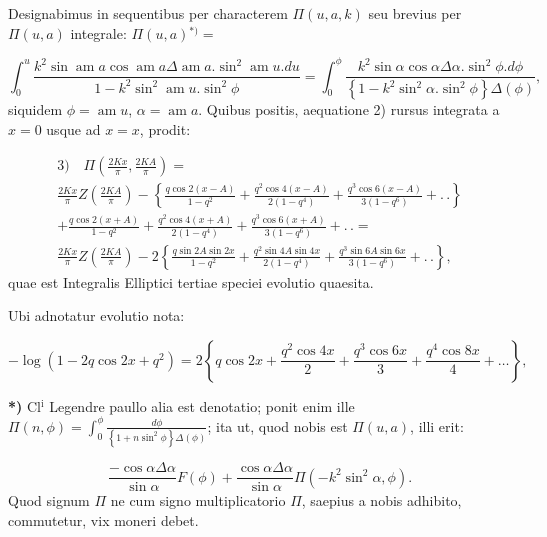 \documentclass{article}
\begin{document}
Designabimus in sequentibus per characterem $\Pi(u,a,k)$ seu brevius per $\Pi(u,a)$ integrale: $\Pi(u,a){}^{*)}=$

\[
\int_{0}^{u}\frac{k^{2}\sin\operatorname{am}a\cos\operatorname{am}a\Delta\operatorname{am}a.\sin^{2}\operatorname{am}u.du}{1-k^{2}\sin^{2}\operatorname{am}u.\sin^{2}\phi}=\int_{0}^{\phi}\frac{k^{2}\sin\alpha\cos\alpha\Delta\alpha.\sin^{2}\phi.d\phi}{\left\{1-k^{2}\sin^{2}\alpha.\sin^{2}\phi\right\}\Delta(\phi)},
\]
siquidem $\phi=\operatorname{am}u$, $\alpha=\operatorname{am}a$. Quibus positis, aequatione 2) rursus integrata a $x=0$ usque ad $x=x$, prodit:

\[
\begin{gathered}
\text{3)}\quad\Pi\left(\frac{2Kx}{\pi},\frac{2KA}{\pi}\right)=\\[1.5ex]
\frac{2Kx}{\pi}Z\left(\frac{2KA}{\pi}\right)-\left\{\frac{q\cos2(x-A)}{1-q^{2}}+\frac{q^{2}\cos4(x-A)}{2(1-q^{4})}+\frac{q^{3}\cos6(x-A)}{3(1-q^{6})}+.\,.\right\}\\[1.5ex]
+\frac{q\cos2(x+A)}{1-q^{2}}+\frac{q^{2}\cos4(x+A)}{2(1-q^{4})}+\frac{q^{3}\cos6(x+A)}{3(1-q^{6})}+.\,.=\\[1.5ex]
\frac{2Kx}{\pi}Z\left(\frac{2KA}{\pi}\right)-2\left\{\frac{q\sin2A\sin2x}{1-q^{2}}+\frac{q^{2}\sin4A\sin4x}{2(1-q^{4})}+\frac{q^{3}\sin6A\sin6x}{3(1-q^{6})}+.\,.\right\},
\end{gathered}
\]
quae est Integralis Elliptici tertiae speciei evolutio quaesita.

Ubi adnotatur evolutio nota:

\[
-\log(1-2q\cos2x+q^{2})=2\left\{q\cos2x+\frac{q^{2}\cos4x}{2}+\frac{q^{3}\cos6x}{3}+\frac{q^{4}\cos8x}{4}+\ldots\right\},
\]

\textbf{*)} Cl$^{\mathrm{i}}$ Legendre paullo alia est denotatio; ponit enim ille $\Pi(n,\phi)=\displaystyle\int_{0}^{\phi}\frac{d\phi}{\left\{1+n\sin^{2}\phi\right\}\Delta(\phi)}$; ita ut, quod nobis est $\Pi(u,a)$, illi erit:

\[
\frac{-\cos\alpha\Delta\alpha}{\sin\alpha}F(\phi)+\frac{\cos\alpha\Delta\alpha}{\sin\alpha}\Pi(-k^{2}\sin^{2}\alpha,\phi).
\]
Quod signum $\Pi$ ne cum signo multiplicatorio $\Pi$, saepius a nobis adhibito, commutetur, vix moneri debet.
\end{document}
